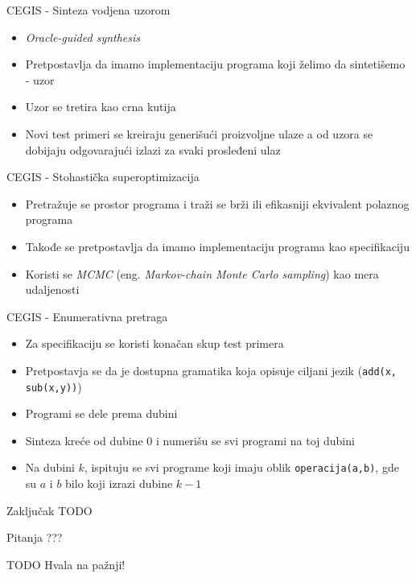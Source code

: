 \documentclass{beamer}
\begin{document}
\begin{frame}{CEGIS - Sinteza vodjena uzorom}
    \begin{itemize}
        \item \emph{Oracle-guided synthesis}
        \item Pretpostavlja da imamo implementaciju programa koji želimo da sintetišemo - uzor
        \item Uzor se tretira kao crna kutija
        \item Novi test primeri se kreiraju generišući proizvoljne ulaze a od uzora se dobijaju odgovarajući izlazi za svaki prosleđeni ulaz
    \end{itemize}
\end{frame}

\begin{frame}{CEGIS - Stohastička superoptimizacija}
    \begin{itemize}
        \item Pretražuje se prostor programa i traži se brži ili efikasniji ekvivalent polaznog programa
        \item Takođe se pretpostavlja da imamo implementaciju programa kao specifikaciju
        \item Koristi se \emph{MCMC} (eng. \emph{Markov-chain Monte Carlo sampling}) kao mera udaljenosti
    \end{itemize}
\end{frame}

\begin{frame}{CEGIS - Enumerativna pretraga}
    \begin{itemize}
        \item Za specifikaciju se koristi konačan skup test primera
        \item Pretpostavja se da je dostupna gramatika koja opisuje ciljani jezik (\texttt{add(x, sub(x,y))})
        \item Programi se dele prema dubini
        \item Sinteza kreće od dubine $0$ i numerišu se svi programi na toj dubini
        \item Na dubini $k$, ispituju se svi programe koji imaju oblik \texttt{operacija(a,b)}, gde su $a$ i $b$ bilo koji izrazi dubine $k-1$
    \end{itemize}
\end{frame}

\begin{frame}{Zaključak}
    \centering
    TODO
\end{frame}

\begin{frame}{Pitanja}
    \centering
    ???
\end{frame}

\begin{frame}{TODO}
    \centering
    Hvala na pažnji!
\end{frame}
\end{document}
